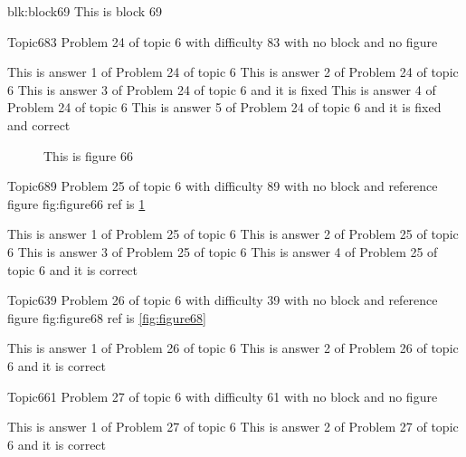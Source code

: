 \documentclass[master]{exam}
\begin{document}
\begin{block}{blk:block69}
This is block 69
\end{block}


\begin{problem}{Topic6}{83}
	Problem 24 of topic 6 with difficulty 83 with no block and no figure
	\begin{answers}
		\answer This is answer 1 of Problem 24 of topic 6 
		\answer This is answer 2 of Problem 24 of topic 6 
		\answer[fixed] This is answer 3 of Problem 24 of topic 6 and it is fixed
		\answer This is answer 4 of Problem 24 of topic 6 
		 This is answer 5 of Problem 24 of topic 6 and it is fixed and correct
	\end{answers}
\end{problem}



\begin{figure}
	\begin{center}
		This is figure 66 
		\label{fig:figure66}
	\end{center}
\end{figure}

\begin{problem}{Topic6}{89}
	Problem 25 of topic 6 with difficulty 89 with no block and reference figure fig:figure66 ref is \ref{fig:figure66}
	\begin{answers}
		\answer This is answer 1 of Problem 25 of topic 6 
		\answer This is answer 2 of Problem 25 of topic 6 
		\answer This is answer 3 of Problem 25 of topic 6 
		\answer[correct] This is answer 4 of Problem 25 of topic 6 and it is correct
	\end{answers}
\end{problem}

\begin{problem}{Topic6}{39}
	Problem 26 of topic 6 with difficulty 39 with no block and reference figure fig:figure68 ref is \ref{fig:figure68}
	\begin{answers}
		\answer This is answer 1 of Problem 26 of topic 6 
		\answer[correct] This is answer 2 of Problem 26 of topic 6 and it is correct
	\end{answers}
\end{problem}

\begin{problem}{Topic6}{61}
	Problem 27 of topic 6 with difficulty 61 with no block and no figure
	\begin{answers}
		\answer This is answer 1 of Problem 27 of topic 6 
		\answer[correct] This is answer 2 of Problem 27 of topic 6 and it is correct
	\end{answers}
\end{problem}
\end{document}
